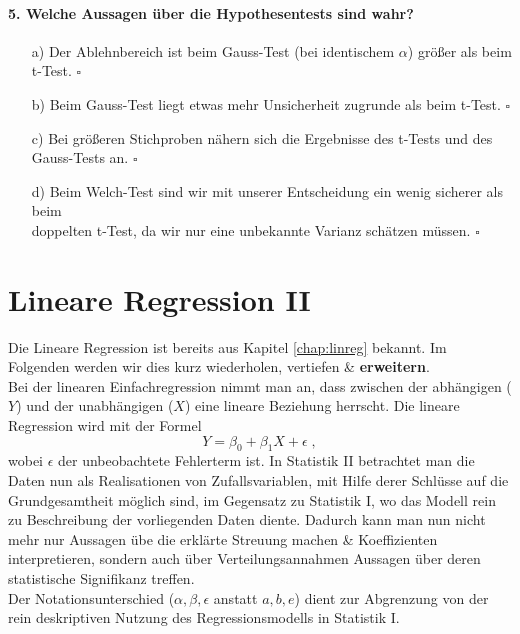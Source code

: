 \documentclass[a4paper]{article}
\newcommand\dangersign{%
 \makebox[1.8em][c]{%
 \makebox[0pt][c]{\raisebox{.15em}{\small!}}%
 \makebox[0pt][c]{\color{red}\Large$\triangle$}}}%
\begin{document}
 \paragraph{5. Welche Aussagen über die Hypothesentests sind wahr?} \begin{itemize}
    \item[a)] Der Ablehnbereich ist beim Gauss-Test (bei identischem $\alpha$) größer als beim t-Test. \hfill $\square$
    \item[b)] Beim Gauss-Test liegt etwas mehr Unsicherheit zugrunde als beim t-Test. \hfill $\square$
    \item[c)] Bei größeren Stichproben nähern sich die Ergebnisse des t-Tests und des Gauss-Tests an. \hfill $\square$
    \item[d)] Beim Welch-Test sind wir mit unserer Entscheidung ein wenig sicherer als beim \\doppelten t-Test, da wir nur eine unbekannte Varianz schätzen müssen. \hfill $\square$
 \end{itemize}  


\clearpage


\section{Lineare Regression II}\label{chap:mult-reg}
Die Lineare Regression ist bereits aus Kapitel \ref{chap:linreg} bekannt. Im Folgenden werden wir dies kurz wiederholen, vertiefen \& \textbf{erweitern}.\\
Bei der linearen Einfachregression nimmt man an, dass zwischen der abhängigen ($Y$) und der unabhängigen ($X$) eine lineare Beziehung herrscht. Die lineare Regression wird mit der Formel 
$$Y = \beta_0 + \beta_1X + \epsilon\;,$$ 
\noindent wobei $\epsilon$ der unbeobachtete Fehlerterm ist. In Statistik II betrachtet man die Daten nun als Realisationen von Zufallsvariablen, mit Hilfe derer Schlüsse auf die Grundgesamtheit möglich sind, im Gegensatz zu Statistik I, wo das Modell rein zu Beschreibung der vorliegenden Daten diente. Dadurch kann man nun nicht mehr nur Aussagen übe die erklärte Streuung machen \& Koeffizienten interpretieren, sondern auch über Verteilungsannahmen Aussagen über deren statistische Signifikanz treffen.\\

\noindent\dangersign Der Notationsunterschied ($\alpha, \beta, \epsilon$ anstatt $a, b, e$) dient zur Abgrenzung von der rein deskriptiven Nutzung des Regressionsmodells in Statistik I.
\end{document}
